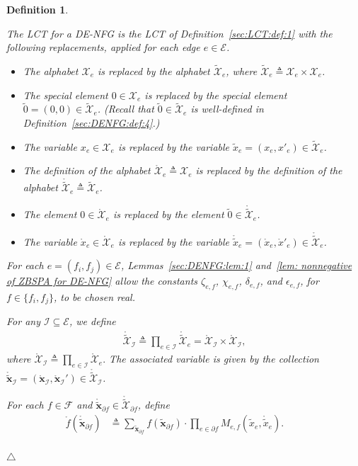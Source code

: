 \documentclass[journal]{IEEEtran}
\newcommand{\add}[1]{{\color{black}#1}}
\newtheorem{definition}[theorem]{Definition}
\newcommand{\manualendsymbol}[1]{%
  \leavevmode\unskip\penalty9999\hbox{}\nobreak\hfill
  \quad\hbox{#1}}
\newcommand{\edefinition}{\manualendsymbol{\ensuremath{\triangle}}}
\newcommand{\vect}[1]{ \bm{#1} }
\newcommand{\set}[1]{\mathcal{#1}}
\newcommand{\setEfull}{ \mathcal{E} }
\newcommand{\setF}{ \mathcal{F} }
\newcommand{\setpf}{ \partial f }
\newcommand{\defeq}{ \triangleq }
\newcommand{\tset}[1]{\tilde{\mathcal{#1}}}
\newcommand{\LCTtset}[1]{\mathring{\tilde{\mathcal{#1}}}}
\newcommand{\LCTset}[1]{\mathring{\mathcal{#1}}}
\newcommand{\LCTtv}[1]{ \mathring{ \tilde{ \vect{#1} } } }
\newcommand{\LCTv}[1]{ \mathring{ \vect{#1} } }
\newcommand{\LCT}[1]{ \mathring{#1} }
\newcommand{\LCTt}[1]{ \mathring{ \tilde{#1} } }
\newcommand{\ef}{ e,f }
\newcommand{\LCTsetxe}{ \LCTset{X}_{e} }
\newcommand{\tx}{ \tilde{x} }
\newcommand{\tvx}{ \tilde{\vect{x}}  }
\newcommand{\tzero}{\tilde{0}}
\begin{document}
\begin{definition}
  \label{def:DENFG:LCT:1}

  \add{The LCT for a DE-NFG is the LCT of Definition~\ref{sec:LCT:def:1} with the following replacements, applied for each edge $e \in \setEfull$.}
  \begin{itemize}

    \item The alphabet $\set{X}_e$ is replaced by the alphabet $\tset{X}_e$, where
          $\tset{X}_e \defeq \set{X}_e \times \set{X}_e$.

    \item The special element $0 \in \set{X}_e$ is replaced by the special element
          $\tzero = (0,0) \in \tset{X}_e$.
          (Recall that $ \tzero \in \tset{X}_e $ is well-defined in Definition~\ref{sec:DENFG:def:4}.)

    \item The variable $x_e \in \set{X}_e$ is replaced by the variable
          $\tx_e = (x_e,x'_e) \in \tset{X}_e$.

    \item The definition of the alphabet
          $\LCTset{X}_e \defeq \set{X}_e$ is
          replaced by the definition of the alphabet
          $\LCTtset{X}_e \defeq \tset{X}_e$.

    \item The element $0 \in \LCTset{X}_e$ is replaced by the element
          $\tzero\in \LCTtset{X}_e$.

    \item The variable $\LCT{x}_e \in \LCTset{X}_e$ is replaced by the variable
          $\LCTt{x}_e = (\LCT{x}_e, \LCT{x}'_e) \in \LCTtset{X}_{e}$.

  \end{itemize}
  For each $e=(f_i,f_j)\in\setEfull$, Lemmas~\ref{sec:DENFG:lem:1} and~\ref{lem: nonnegative of ZBSPA for DE-NFG} allow the constants $\zeta_{e,f}$, $\chi_{e,f}$, $\delta_{e,f}$, and $\epsilon_{e,f}$, for $f\in\{f_i,f_j\}$, to be chosen real.

  For any $ \set{I} \subseteq \setEfull $, we define
  \begin{align*}
    \LCTtset{X}_{ \set{I} }
    \defeq \prod_{e \in \set{I}} \LCTtset{X}_{ e }
    = \LCTset{X}_{ \set{I} } \times \LCTset{X}_{ \set{I} },
  \end{align*}
  where
  $
    \LCTset{X}_{ \set{I} } \defeq
    \prod_{e \in \set{I}} \LCTsetxe.
  $
  The associated variable is given by the collection
  $ \LCTtv{x}_{\set{I}} = ( \LCTv{x}_{\set{I}}, \LCTv{x}_{\set{I}}' )
    \in \LCTtset{X}_{ \set{I} } $.

  For each $ f \in \setF $ and
  $ \LCTtv{x}_{\setpf} \in \LCTtset{X}_{\setpf} $, define
  \begin{align}
    \LCT{f}(\LCTtv{x}_{\setpf})
     & \defeq \sum_{\tvx_{\setpf}}
    f(\tvx_{\setpf})
    \cdot
    \prod_{e \in \setpf}
    M_{\ef}(\tx_{e}, \LCTt{x}_e). \qquad
    \label{sec:LCT:eqn:1}
  \end{align}
  \\[-0.6 cm]{\edefinition}
\end{definition}
\end{document}
